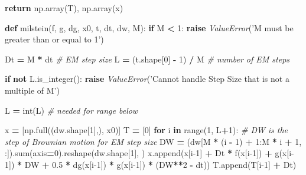 \documentclass[]{article}
\newenvironment{Shaded}{\begin{snugshade}}{\end{snugshade}}
\newcommand{\BuiltInTok}[1]{#1}
\newcommand{\CommentTok}[1]{\textcolor[rgb]{0.56,0.35,0.01}{\textit{#1}}}
\newcommand{\ControlFlowTok}[1]{\textcolor[rgb]{0.13,0.29,0.53}{\textbf{#1}}}
\newcommand{\DecValTok}[1]{\textcolor[rgb]{0.00,0.00,0.81}{#1}}
\newcommand{\FloatTok}[1]{\textcolor[rgb]{0.00,0.00,0.81}{#1}}
\newcommand{\KeywordTok}[1]{\textcolor[rgb]{0.13,0.29,0.53}{\textbf{#1}}}
\newcommand{\NormalTok}[1]{#1}
\newcommand{\OperatorTok}[1]{\textcolor[rgb]{0.81,0.36,0.00}{\textbf{#1}}}
\newcommand{\PreprocessorTok}[1]{\textcolor[rgb]{0.56,0.35,0.01}{\textit{#1}}}
\newcommand{\StringTok}[1]{\textcolor[rgb]{0.31,0.60,0.02}{#1}}
\begin{document}
\begin{Shaded}
\begin{Highlighting}[]
    \ControlFlowTok{return}\NormalTok{ np.array(T), np.array(x)}


\KeywordTok{def}\NormalTok{ milstein(f, g, dg, x0, t, dt, dw, M):}
    \ControlFlowTok{if}\NormalTok{ M }\OperatorTok{<} \DecValTok{1}\NormalTok{:}
        \ControlFlowTok{raise} \PreprocessorTok{ValueError}\NormalTok{(}\StringTok{'M must be greater than or equal to 1'}\NormalTok{)}

\NormalTok{    Dt }\OperatorTok{=}\NormalTok{ M }\OperatorTok{*}\NormalTok{ dt  }\CommentTok{# EM step size}
\NormalTok{    L }\OperatorTok{=}\NormalTok{ (t.shape[}\DecValTok{0}\NormalTok{] }\OperatorTok{-} \DecValTok{1}\NormalTok{) }\OperatorTok{/}\NormalTok{ M  }\CommentTok{# number of EM steps}

    \ControlFlowTok{if} \KeywordTok{not}\NormalTok{ L.is_integer():}
        \ControlFlowTok{raise} \PreprocessorTok{ValueError}\NormalTok{(}\StringTok{'Cannot handle Step Size that is not a multiple of M'}\NormalTok{)}

\NormalTok{    L }\OperatorTok{=} \BuiltInTok{int}\NormalTok{(L)  }\CommentTok{# needed for range below}

\NormalTok{    x }\OperatorTok{=}\NormalTok{ [np.full((dw.shape[}\DecValTok{1}\NormalTok{],), x0)]}
\NormalTok{    T }\OperatorTok{=}\NormalTok{ [}\DecValTok{0}\NormalTok{]}
    \ControlFlowTok{for}\NormalTok{ i }\KeywordTok{in} \BuiltInTok{range}\NormalTok{(}\DecValTok{1}\NormalTok{, L}\OperatorTok{+}\DecValTok{1}\NormalTok{):}
        \CommentTok{# DW is the step of Brownian motion for EM step size}
\NormalTok{        DW }\OperatorTok{=}\NormalTok{ (dw[M }\OperatorTok{*}\NormalTok{ (i }\OperatorTok{-} \DecValTok{1}\NormalTok{) }\OperatorTok{+} \DecValTok{1}\NormalTok{:M }\OperatorTok{*}\NormalTok{ i }\OperatorTok{+} \DecValTok{1}\NormalTok{, :]).}\BuiltInTok{sum}\NormalTok{(axis}\OperatorTok{=}\DecValTok{0}\NormalTok{).reshape(dw.shape[}\DecValTok{1}\NormalTok{], )}
\NormalTok{        x.append(x[i}\DecValTok{-1}\NormalTok{] }\OperatorTok{+}\NormalTok{ Dt }\OperatorTok{*}\NormalTok{ f(x[i}\DecValTok{-1}\NormalTok{]) }\OperatorTok{+}\NormalTok{ g(x[i}\DecValTok{-1}\NormalTok{]) }\OperatorTok{*}\NormalTok{ DW}
                 \OperatorTok{+} \FloatTok{0.5} \OperatorTok{*}\NormalTok{ dg(x[i}\DecValTok{-1}\NormalTok{]) }\OperatorTok{*}\NormalTok{ g(x[i}\DecValTok{-1}\NormalTok{]) }\OperatorTok{*}\NormalTok{ (DW}\OperatorTok{**}\DecValTok{2} \OperatorTok{-}\NormalTok{ dt))}
\NormalTok{        T.append(T[i}\DecValTok{-1}\NormalTok{] }\OperatorTok{+}\NormalTok{ Dt)}


\end{Highlighting}
\end{Shaded}
\end{document}
